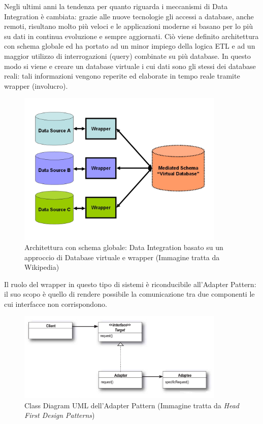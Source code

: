 \documentclass[12pt]{report}
\begin{document}
\vspace{5mm} %

Negli ultimi anni la tendenza per quanto riguarda i meccanismi di Data Integration è cambiata: grazie alle nuove tecnologie gli accessi a database, anche remoti, risultano molto più veloci e le applicazioni moderne si basano per lo più su dati in continua evoluzione e sempre aggiornati.
Ciò viene definito architettura con schema globale ed ha portato ad un minor impiego della logica ETL e ad un maggior utilizzo di interrogazioni (query) combinate su più database.
In questo modo si viene e creare un database virtuale i cui dati sono gli stessi dei database reali: tali informazioni vengono reperite ed elaborate in tempo reale tramite wrapper (involucro).

\begin{figure}[H]
    \centering
    \includegraphics[width=280pt]{Dataintegration+Wrapper.jpg}
    \caption{Architettura con schema globale: Data Integration basato su un approccio di Database virtuale e wrapper (Immagine tratta da Wikipedia\cite{Integration-Wiki})}
    \label{fig:Data_Integration_Wrapper}
\end{figure}

\newpage

Il ruolo del wrapper in questo tipo di sistemi è riconducibile all'Adapter Pattern: il suo scopo è quello di rendere possibile la comunicazione tra due componenti le cui interfacce non corrispondono.

\begin{figure}[H]
    \centering
    \includegraphics[width=280pt]{Adapter.jpg}
    \caption{Class Diagram UML dell'Adapter Pattern (Immagine tratta da \textit{Head First Design Patterns}\cite{Pattern})}
    \label{fig:Adapter_Pattern}
\end{figure}
\end{document}
